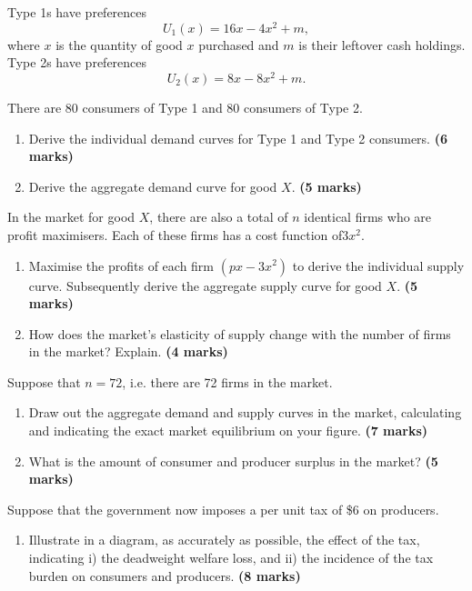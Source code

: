\documentclass[12pt]{article}
\begin{document}
\noindent
Type 1s have preferences
\[
U_1(x)=16x-4x^2+m,
\]
where \(x\) is the quantity of good \(x\) purchased and \(m\) is their leftover cash holdings. Type 2s have preferences
\[
U_2(x)=8x-8x^2+m.
\]

\bigskip
\noindent There are 80 consumers of Type 1 and 80 consumers of Type 2.

\begin{enumerate}[label=(\alph*)]
    \item Derive the individual demand curves for Type 1 and Type 2 consumers. \hfill \textbf{(6 marks)}
    \item Derive the aggregate demand curve for good \(X\). \hfill \textbf{(5 marks)}
\end{enumerate}


\bigskip
\noindent
In the market for good \(X\), there are also a total of \(n\) identical firms who are profit maximisers. Each of these firms has a cost function of$3x^2.$
\begin{enumerate}[label=(\alph*), start=3]
    \item Maximise the profits of each firm \((px-3x^2)\) to derive the individual supply curve. Subsequently derive the aggregate supply curve for good \(X\). \hfill \textbf{(5 marks)}
    \item How does the market’s elasticity of supply change with the number of firms in the market? Explain. \hfill \textbf{(4 marks)}
\end{enumerate}

\bigskip
\noindent
Suppose that \(n=72\), i.e. there are 72 firms in the market.

\begin{enumerate}[label=(\alph*), start=5]
    \item Draw out the aggregate demand and supply curves in the market, calculating and indicating the exact market equilibrium on your figure. \hfill \textbf{(7 marks)}
    \item What is the amount of consumer and producer surplus in the market? \hfill \textbf{(5 marks)}
\end{enumerate}

\noindent
Suppose that the government now imposes a per unit tax of \$6 on producers.

\begin{enumerate}[label=(\alph*), start=7]
    \item Illustrate in a diagram, as accurately as possible, the effect of the tax, indicating i) the deadweight welfare loss, and ii) the incidence of the tax burden on consumers and producers. \hfill \textbf{(8 marks)}
\end{enumerate}
\end{document}
